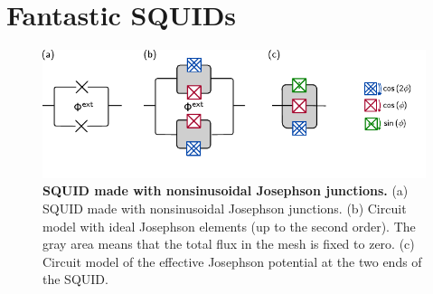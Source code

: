 \documentclass[../main]{subfiles}
\begin{document}
\chapter{Fantastic SQUIDs}
\label{app:squid}

\lipsum[1-2]

\begin{figure}[h]
    \centering
    \includegraphics{appendix/img/squid.pdf}
    \caption{\textbf{SQUID made with nonsinusoidal Josephson junctions.}
    (a) SQUID made with nonsinusoidal Josephson junctions.
    (b) Circuit model with ideal Josephson elements (up to the second order). The gray area means that the total flux in the mesh is fixed to zero.
    (c) Circuit model of the effective Josephson potential at the two ends of the SQUID.
    }
    \label{fig:squid}
\end{figure}

\lipsum[3-7]
\end{document}
